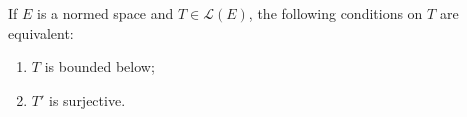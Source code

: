 If $E$ is a normed space and $T \in \mathcal{L}(E)$, the following conditions on $T$ are equivalent:
\begin{enumerate}
\item[(a)] $T$ is bounded below;
\item[(b)] $T'$ is surjective.
\end{enumerate}
